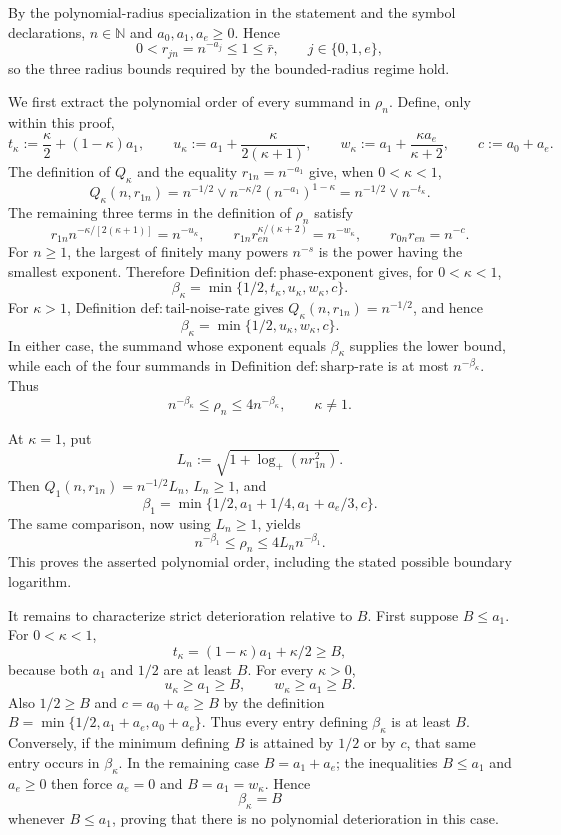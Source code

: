 By the polynomial-radius specialization in the statement and the symbol declarations, \(n\in\mathbb N\) and \(a_0,a_1,a_e\geq 0\).  Hence
\[
0<r_{jn}=n^{-a_j}\leq 1\leq \bar r,
\qquad j\in\{0,1,e\},
\]
so the three radius bounds required by the bounded-radius regime hold.

We first extract the polynomial order of every summand in \(\rho_n\).  Define, only within this proof,
\[
t_\kappa:=\frac{\kappa}{2}+(1-\kappa)a_1,
\qquad
u_\kappa:=a_1+\frac{\kappa}{2(\kappa+1)},
\qquad
w_\kappa:=a_1+\frac{\kappa a_e}{\kappa+2},
\qquad
c:=a_0+a_e.
\]
The definition of \(Q_\kappa\) and the equality \(r_{1n}=n^{-a_1}\) give, when \(0<\kappa<1\),
\[
Q_\kappa(n,r_{1n})
=n^{-1/2}\vee n^{-\kappa/2}(n^{-a_1})^{1-\kappa}
=n^{-1/2}\vee n^{-t_\kappa}.
\]
The remaining three terms in the definition of \(\rho_n\) satisfy
\[
r_{1n}n^{-\kappa/[2(\kappa+1)]}=n^{-u_\kappa},
\qquad
r_{1n}r_{en}^{\kappa/(\kappa+2)}=n^{-w_\kappa},
\qquad
r_{0n}r_{en}=n^{-c}.
\]
For \(n\geq1\), the largest of finitely many powers \(n^{-s}\) is the power having the smallest exponent.  Therefore Definition \(\mathrm{def{:}phase\mbox{-}exponent}\) gives, for \(0<\kappa<1\),
\[
\beta_\kappa=\min\{1/2,t_\kappa,u_\kappa,w_\kappa,c\}.
\]
For \(\kappa>1\), Definition \(\mathrm{def{:}tail\mbox{-}noise\mbox{-}rate}\) gives \(Q_\kappa(n,r_{1n})=n^{-1/2}\), and hence
\[
\beta_\kappa=\min\{1/2,u_\kappa,w_\kappa,c\}.
\]
In either case, the summand whose exponent equals \(\beta_\kappa\) supplies the lower bound, while each of the four summands in Definition \(\mathrm{def{:}sharp\mbox{-}rate}\) is at most \(n^{-\beta_\kappa}\).  Thus
\[
n^{-\beta_\kappa}\leq \rho_n\leq 4n^{-\beta_\kappa},
\qquad \kappa\neq1.
\]

At \(\kappa=1\), put
\[
L_n:=\sqrt{1+\log_+(nr_{1n}^2)}.
\]
Then \(Q_1(n,r_{1n})=n^{-1/2}L_n\), \(L_n\geq1\), and
\[
\beta_1=\min\{1/2,a_1+1/4,a_1+a_e/3,c\}.
\]
The same comparison, now using \(L_n\geq1\), yields
\[
n^{-\beta_1}\leq \rho_n\leq4L_n n^{-\beta_1}.
\]
This proves the asserted polynomial order, including the stated possible boundary logarithm.

It remains to characterize strict deterioration relative to \(B\).  First suppose \(B\leq a_1\).  For \(0<\kappa<1\),
\[
t_\kappa=(1-\kappa)a_1+\kappa/2\geq B,
\]
because both \(a_1\) and \(1/2\) are at least \(B\).  For every \(\kappa>0\),
\[
u_\kappa\geq a_1\geq B,
\qquad
w_\kappa\geq a_1\geq B.
\]
Also \(1/2\geq B\) and \(c=a_0+a_e\geq B\) by the definition
\(B=\min\{1/2,a_1+a_e,a_0+a_e\}\).  Thus every entry defining \(\beta_\kappa\) is at least \(B\).  Conversely, if the minimum defining \(B\) is attained by \(1/2\) or by \(c\), that same entry occurs in \(\beta_\kappa\).  In the remaining case \(B=a_1+a_e\); the inequalities \(B\leq a_1\) and \(a_e\geq0\) then force \(a_e=0\) and \(B=a_1=w_\kappa\).  Hence
\[
\beta_\kappa=B
\]
whenever \(B\leq a_1\), proving that there is no polynomial deterioration in this case.

